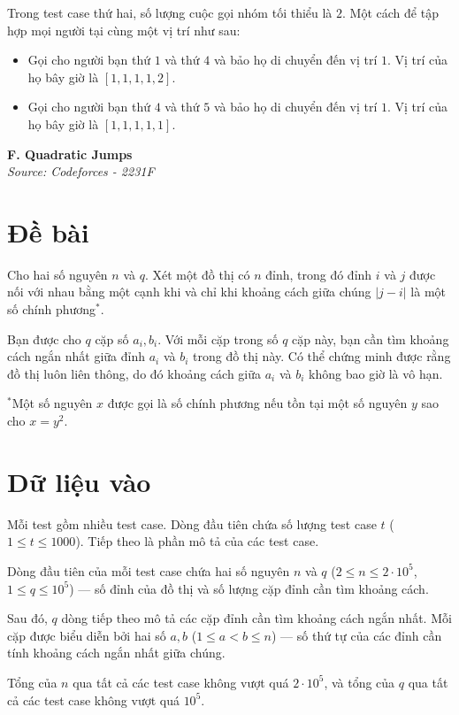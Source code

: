 \documentclass[11pt]{article}
\newcommand{\problem}[2]{
    \begin{problembox}
    \begin{center}
        \Large \textbf{#1} \\
        \vspace{0.2cm}
        \small \textit{Source: #2}
    \end{center}
    \end{problembox}
}
\begin{document}
Trong test case thứ hai, số lượng cuộc gọi nhóm tối thiểu là $2$. Một cách để tập hợp mọi người tại cùng một vị trí như sau:
\begin{itemize}
    \item Gọi cho người bạn thứ $1$ và thứ $4$ và bảo họ di chuyển đến vị trí $1$. Vị trí của họ bây giờ là $[1, 1, 1, 1, 2]$.
    \item Gọi cho người bạn thứ $4$ và thứ $5$ và bảo họ di chuyển đến vị trí $1$. Vị trí của họ bây giờ là $[1, 1, 1, 1, 1]$.
\end{itemize}

\newpage
\problem{F. Quadratic Jumps}{Codeforces - 2231F}

\section*{Đề bài}
Cho hai số nguyên $n$ và $q$. Xét một đồ thị có $n$ đỉnh, trong đó đỉnh $i$ và $j$ được nối với nhau bằng một cạnh khi và chỉ khi khoảng cách giữa chúng $|j - i|$ là một số chính phương$^*$.

Bạn được cho $q$ cặp số $a_i, b_i$. Với mỗi cặp trong số $q$ cặp này, bạn cần tìm khoảng cách ngắn nhất giữa đỉnh $a_i$ và $b_i$ trong đồ thị này. Có thể chứng minh được rằng đồ thị luôn liên thông, do đó khoảng cách giữa $a_i$ và $b_i$ không bao giờ là vô hạn.

$^*$Một số nguyên $x$ được gọi là số chính phương nếu tồn tại một số nguyên $y$ sao cho $x = y^2$.

\section*{Dữ liệu vào}
Mỗi test gồm nhiều test case. Dòng đầu tiên chứa số lượng test case $t$ ($1 \le t \le 1000$). Tiếp theo là phần mô tả của các test case.

Dòng đầu tiên của mỗi test case chứa hai số nguyên $n$ và $q$ ($2 \le n \le 2 \cdot 10^5$, $1 \le q \le 10^5$) — số đỉnh của đồ thị và số lượng cặp đỉnh cần tìm khoảng cách.

Sau đó, $q$ dòng tiếp theo mô tả các cặp đỉnh cần tìm khoảng cách ngắn nhất. Mỗi cặp được biểu diễn bởi hai số $a, b$ ($1 \leq a < b \leq n$) — số thứ tự của các đỉnh cần tính khoảng cách ngắn nhất giữa chúng.

\begin{constraintbox}
Tổng của $n$ qua tất cả các test case không vượt quá $2 \cdot 10^5$, và tổng của $q$ qua tất cả các test case không vượt quá $10^5$.
\end{constraintbox}
\end{document}
